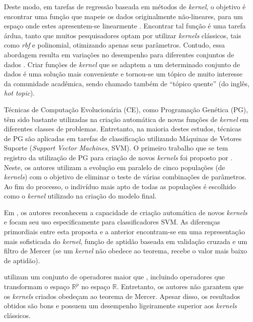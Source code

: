 \clearpage

Deste modo, em tarefas de regressão baseada em métodos de \textit{kernel}, o objetivo é encontrar uma função que mapeie os dados originalmente não-lineares, para um espaço onde estes apresentem-se linearmente \cite{smola1998}. Encontrar tal função é uma tarefa árdua, tanto que muitos pesquisadores optam por utilizar \textit{kernels} clássicos, tais como \textit{rbf} e polinomial, otimizando apenas seus parâmetros. Contudo, essa abordagem resulta em variações no desempenho para diferentes conjuntos de dados \cite{howley2005}. Criar funções de \textit{kernel} que se adaptem a um determinado conjunto de dados é uma solução mais conveniente e tornou-se um tópico de muito interesse da comunidade acadêmica, sendo chamado também de ``tópico quente'' (do inglês, \textit{hot topic}).

Técnicas de Computação Evolucionária (CE), como Programação Genética (PG), têm sido bastante utilizadas na criação automática de novas funções de \textit{kernel} em diferentes classes de problemas. Entretanto, na maioria destes estudos, técnicas de PG são aplicadas em tarefas de classificação utilizando Máquinas de Vetores Suporte (\textit{Support Vector Machines}, SVM). O primeiro trabalho que se tem registro da utilização de PG para criação de novos \textit{kernels} foi proposto por . Neste, os autores utilizam a evolução em paralelo de cinco populações (de \textit{kernels}) com o objetivo de eliminar o teste de várias combinações de parâmetros. Ao fim do processo, o indivíduo mais apto de todas as populações é escolhido como o \textit{kernel} utilizado na criação do modelo final.

Em \cite{howley2006}, os autores reconhecem a capacidade de criação automática de novos \textit{kernels} e focam seu uso especificamente para classificadores SVM. As diferenças primordiais entre esta proposta e a anterior encontram-se em uma representação mais sofisticada do \textit{kernel}, função de aptidão baseada em validação cruzada e um filtro de Mercer (se um \textit{kernel} não obedece ao teorema, recebe o valor mais baixo de aptidão).

 utilizam um conjunto de operadores maior que \cite{howley2006}, incluindo operadores que transformam o espaço $\mathbb{R}^p$ no espaço $\mathbb{R}$. Entretanto, os autores não garantem que os \textit{kernels} criados obedeçam ao teorema de Mercer. Apesar disso, os resultados obtidos são bons e possuem um desempenho ligeiramente superior aos \textit{kernels} clássicos.

